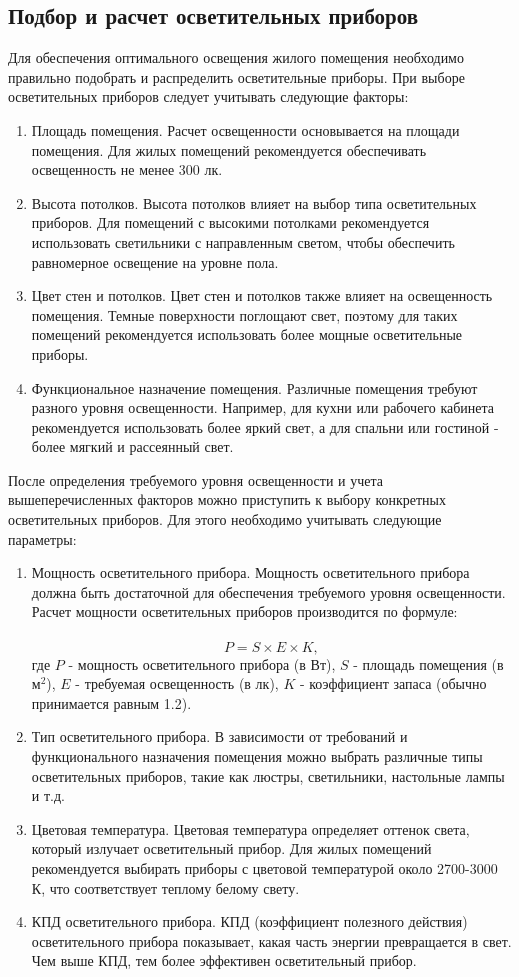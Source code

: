 \documentclass{article}
\begin{document}
\subsection{Подбор и расчет осветительных приборов}
Для обеспечения оптимального освещения жилого помещения необходимо правильно подобрать и распределить осветительные приборы. При выборе осветительных приборов следует учитывать следующие факторы:
\begin{enumerate}
\item Площадь помещения. Расчет освещенности основывается на площади помещения. Для жилых помещений рекомендуется обеспечивать освещенность не менее 300 лк.
\item Высота потолков. Высота потолков влияет на выбор типа осветительных приборов. Для помещений с высокими потолками рекомендуется использовать светильники с направленным светом, чтобы обеспечить равномерное освещение на уровне пола.
\item Цвет стен и потолков. Цвет стен и потолков также влияет на освещенность помещения. Темные поверхности поглощают свет, поэтому для таких помещений рекомендуется использовать более мощные осветительные приборы.
\item Функциональное назначение помещения. Различные помещения требуют разного уровня освещенности. Например, для кухни или рабочего кабинета рекомендуется использовать более яркий свет, а для спальни или гостиной - более мягкий и рассеянный свет.
\end{enumerate}
После определения требуемого уровня освещенности и учета вышеперечисленных факторов можно приступить к выбору конкретных осветительных приборов. Для этого необходимо учитывать следующие параметры:
\begin{enumerate}
\item Мощность осветительного прибора. Мощность осветительного прибора должна быть достаточной для обеспечения требуемого уровня освещенности. Расчет мощности осветительных приборов производится по формуле:\\
~\\
\[ P = S \times E \times K, \]
где \( P \) - мощность осветительного прибора (в Вт), \( S \) - площадь помещения (в \( \text{м}^2 \)), \( E \) - требуемая освещенность (в лк), \( K \) - коэффициент запаса (обычно принимается равным 1.2).
\item Тип осветительного прибора. В зависимости от требований и функционального назначения помещения можно выбрать различные типы осветительных приборов, такие как люстры, светильники, настольные лампы и т.д.
\item Цветовая температура. Цветовая температура определяет оттенок света, который излучает осветительный прибор. Для жилых помещений рекомендуется выбирать приборы с цветовой температурой около 2700-3000 К, что соответствует теплому белому свету.
\item КПД осветительного прибора. КПД (коэффициент полезного действия) осветительного прибора показывает, какая часть энергии превращается в свет. Чем выше КПД, тем более эффективен осветительный прибор.
\end{enumerate}
\end{document}
